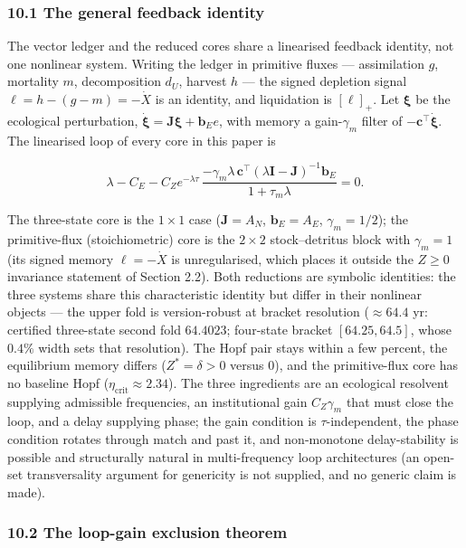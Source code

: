 \documentclass[11pt]{article}
\begin{document}
\subsubsection{10.1 The general feedback
identity}\label{the-general-feedback-identity}

The vector ledger and the reduced cores share a linearised feedback
identity, not one nonlinear system. Writing the ledger in primitive
fluxes --- assimilation \(g\), mortality \(m\), decomposition \(d_U\),
harvest \(h\) --- the signed depletion signal
\(\ell = h - (g - m) = -\dot X\) is an identity, and liquidation is
\([\ell]_+\). Let \(\boldsymbol{\xi}\) be the ecological perturbation,
\(\dot{\boldsymbol{\xi}} = \mathbf{J}\boldsymbol{\xi} + \mathbf{b}_E e\),
with memory a gain-\(\gamma_m\) filter of
\(-\mathbf{c}^\top\dot{\boldsymbol{\xi}}\). The linearised loop of every
core in this paper is

\[\lambda - C_E - C_Z e^{-\lambda\tau}\, \frac{-\gamma_m\lambda\,\mathbf{c}^\top(\lambda\mathbf{I} - \mathbf{J})^{-1}\mathbf{b}_E}{1 + \tau_m\lambda} = 0. \tag{14}\]

The three-state core is the \(1\times1\) case (\(\mathbf{J} = A_N\),
\(\mathbf{b}_E = A_E\), \(\gamma_m = 1/2\)); the primitive-flux
(stoichiometric) core is the \(2\times2\) stock--detritus block with
\(\gamma_m = 1\) (its signed memory \(\ell = -\dot X\) is unregularised,
which places it outside the \(Z \ge 0\) invariance statement of Section
2.2). Both reductions are symbolic identities: the three systems share
this characteristic identity but differ in their nonlinear objects ---
the upper fold is version-robust at bracket resolution (\(\approx64.4\)
yr: certified three-state second fold \(64.4023\); four-state bracket
\([64.25, 64.5]\), whose \(0.4\%\) width sets that resolution). The Hopf
pair stays within a few percent, the equilibrium memory differs
(\(Z^* = \delta > 0\) versus \(0\)), and the primitive-flux core has no
baseline Hopf (\(\eta_{\mathrm{crit}} \approx 2.34\)). The three
ingredients are an ecological resolvent supplying admissible
frequencies, an institutional gain \(C_Z\gamma_m\) that must close the
loop, and a delay supplying phase; the gain condition is
\(\tau\)-independent, the phase condition rotates through match and past
it, and non-monotone delay-stability is possible and structurally
natural in multi-frequency loop architectures (an open-set
transversality argument for genericity is not supplied, and no generic
claim is made).

\subsubsection{10.2 The loop-gain exclusion
theorem}\label{the-loop-gain-exclusion-theorem}
\end{document}
